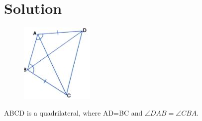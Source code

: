 \documentclass[journal,12pt,twocolumn]{IEEEtran}
\begin{document}
\section{Solution}
\renewcommand{\thefigure}{1}
\begin{figure}[!htb]
	\centering
	\includegraphics[width=\columnwidth]{assignment3fig.jpg}
	\caption{\label{fig1}}
	\label{fig:1}
\end{figure}
ABCD is a quadrilateral, where AD=BC and $\angle DAB= \angle CBA$.
\end{document}
